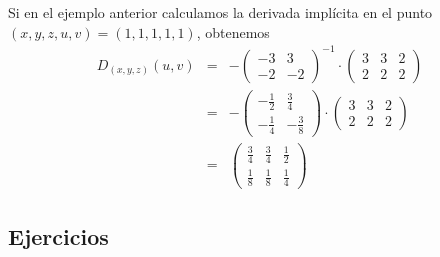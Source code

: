 \begin{frame}
  \begin{eg}
    Si en el ejemplo anterior calculamos la derivada implícita en el punto $(x,y,z,u,v)=(1,1,1,1,1)$, obtenemos
    \begin{eqnarray*}
      D_{(x,y,z)}(u,v) &=& -\left(\begin{array}{rr}
        -3 &  3\\
        -2 & -2
      \end{array}\right)^{-1}\cdot\begin{pmatrix}
        3 & 3 & 2\\
        2 & 2 & 2
      \end{pmatrix}\\[2mm]
      &=& -\left(\begin{array}{rr}
        -\frac{1}{2} & \frac{3}{4}\\[2mm]
        -\frac{1}{4} & -\frac{3}{8}
      \end{array}\right)\cdot\begin{pmatrix}
        3 & 3 & 2\\
        2 & 2 & 2
      \end{pmatrix}\\[2mm]
      &=& \begin{pmatrix}
        \frac{3}{4} & \frac{3}{4} & \frac{1}{2}\\[2mm]
        \frac{1}{8} & \frac{1}{8} & \frac{1}{4}
      \end{pmatrix}
    \end{eqnarray*}
  \end{eg}
\end{frame}


\subsection{Ejercicios}
\begin{frame}
\subsectionpage
\end{frame}

